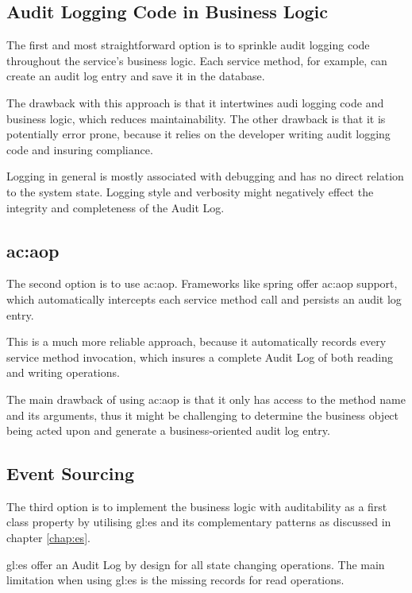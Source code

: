 \subsection{Audit Logging Code in Business Logic}

The first and most straightforward option is to sprinkle audit logging code throughout the service’s business logic. Each service method, for example, can create an audit log entry and save it in the database. 

The drawback with this approach is that it intertwines audi logging code and business logic, which reduces maintainability.
The other drawback is that it is potentially error prone, because it relies on the developer writing audit logging code and insuring compliance.

Logging in general is mostly associated with debugging and has no direct relation to the system state. Logging style and verbosity might negatively effect the integrity and completeness of the Audit Log.

\subsection{\acrlong{ac:aop}}

The second option is to use \gls{ac:aop}. Frameworks like spring offer \gls{ac:aop} support, which automatically intercepts each service method call and persists an audit log entry.

This is a much more reliable approach, because it automatically records every service method invocation, which insures a complete Audit Log of both reading and writing operations.

The main drawback of using \gls{ac:aop} is that it only has access to the method name and its arguments, thus it might be challenging to determine the business object being acted upon and generate a business-oriented audit log entry.

\subsection{Event Sourcing}\label{sec:saes}

The third option is to implement the business logic with auditability as a first class property by utilising \gls{gl:es} and its complementary patterns as discussed in chapter \ref{chap:es}. 

\gls{gl:es} offer an Audit Log by design for all state changing operations. The main limitation when using \gls{gl:es} is the missing records for read operations.

